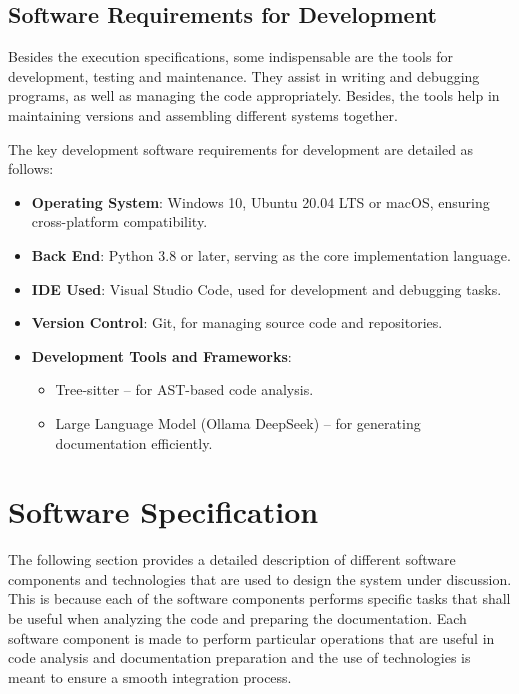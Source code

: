 \subsection{Software Requirements for Development}
\hspace{0.5cm}Besides the execution specifications, some indispensable are the tools for development, testing and maintenance. They assist in writing and debugging programs, as well as managing the code appropriately. Besides, the tools help in maintaining versions and assembling different systems together. 

The key development software requirements for development are detailed as follows:
\begin{itemize}
    \item \textbf{Operating System}: Windows 10, Ubuntu 20.04 LTS or macOS, ensuring cross-platform compatibility.
    
    \item \textbf{Back End}: Python 3.8 or later, serving as the core implementation language.
    
    \item \textbf{IDE Used}: Visual Studio Code, used for development and debugging tasks.
    
    \item \textbf{Version Control}: Git, for managing source code and repositories.
    
    \item \textbf{Development Tools and Frameworks}:
    \begin{itemize}
        \item Tree-sitter -- for AST-based code analysis.
        \item Large Language Model (Ollama DeepSeek) -- for generating documentation efficiently.
    \end{itemize}
\end{itemize}
\section{Software Specification}
\hspace{0.5cm}The following section provides a detailed description of different software components and technologies that are used to design the system under discussion. This is because each of the software components performs specific tasks that shall be useful when analyzing the code and preparing the documentation. Each software component is made to perform particular operations that are useful in code analysis and documentation preparation and the use of technologies is meant to ensure a smooth integration process. 

